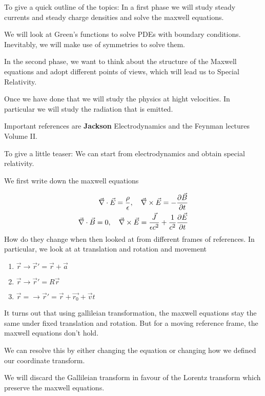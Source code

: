 To give a quick outline of the topics:
In a first phase we will study steady currents and steady charge densities and solve the maxwell equations.

We will look at Green's functions to solve PDEs with boundary conditions. Inevitably, we will make use of symmetries to solve them.

In the second phase, we want to think about the structure of the Maxwell equations and adopt different points of views, which will lead us to Special Relativity.

Once we have done that we will study the physics at hight velocities. In particular we will study the radiation that is emitted.

Important references are \textbf{Jackson} Electrodynamics and the Feynman lectures Volume II.


To give a little teaser: We can start from electrodynamics and obtain special relativity.

We first write down the maxwell equations

\begin{align*}
  \vec{\nabla} \cdot \vec{E} = \frac{\rho}{\epsilon}, \quad \vec{\nabla}\times \vec{E} = - \frac{\partial \vec{B}}{\partial t}\\
  \vec{\nabla} \cdot \vec{B} = 0, \quad \vec{\nabla}\times \vec{E} = \frac{\vec{J}}{\epsilon c^2} + \frac{1}{c^2}\frac{\partial \vec{E}}{\partial t}
\end{align*}
How do they change when then looked at from different frames of references. 
In particular, we look at at translation and rotation and movement
\begin{enumerate}
  \item $\vec{r} \to \vec{r}' = \vec{r} + \vec{a}$
  \item $\vec{r} \to  \vec{r}' = R \vec{r}$
  \item $\vec{r} = \to \vec{r}' = \vec{r} + \vec{r_0} + \vec{v}t$
\end{enumerate}
It turns out that using gallileian transformation, the maxwell equations stay the same under fixed translation and rotation. But for a moving reference frame, the maxwell equations don't hold.

We can resolve this by either changing the equation or changing how we defined our coordinate transform.

We will discard the Gallileian transform in favour of the Lorentz transform which preserve the maxwell equations.


